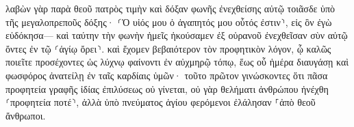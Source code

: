\documentclass{openreader}
\begin{document}
λαβὼν γὰρ παρὰ θεοῦ πατρὸς τιμὴν καὶ δόξαν φωνῆς ἐνεχθείσης αὐτῷ τοιᾶσδε ὑπὸ τῆς μεγαλοπρεποῦς δόξης· ⸂Ὁ υἱός μου ὁ ἀγαπητός μου οὗτός ἐστιν⸃, εἰς ὃν ἐγὼ εὐδόκησα— 
καὶ ταύτην τὴν φωνὴν ἡμεῖς ἠκούσαμεν ἐξ οὐρανοῦ ἐνεχθεῖσαν σὺν αὐτῷ ὄντες ἐν τῷ ⸂ἁγίῳ ὄρει⸃. 
καὶ ἔχομεν βεβαιότερον τὸν προφητικὸν λόγον, ᾧ καλῶς ποιεῖτε προσέχοντες ὡς λύχνῳ φαίνοντι ἐν αὐχμηρῷ τόπῳ, ἕως οὗ ἡμέρα διαυγάσῃ καὶ φωσφόρος ἀνατείλῃ ἐν ταῖς καρδίαις ὑμῶν· 
τοῦτο πρῶτον γινώσκοντες ὅτι πᾶσα προφητεία γραφῆς ἰδίας ἐπιλύσεως οὐ γίνεται, 
οὐ γὰρ θελήματι ἀνθρώπου ἠνέχθη ⸂προφητεία ποτέ⸃, ἀλλὰ ὑπὸ πνεύματος ἁγίου φερόμενοι ἐλάλησαν ⸀ἀπὸ θεοῦ ἄνθρωποι. 
\end{document}
